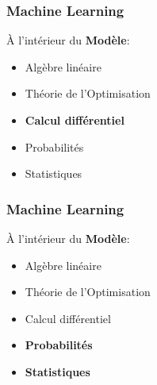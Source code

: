 \documentclass{formation}
\begin{document}
\begin{frame}
  \frametitle{Machine Learning}
  \begin{minipage}[c]{0.41\linewidth}
    À l'intérieur du \textbf{Modèle}:
    \begin{itemize}
    \item Algèbre linéaire
    \item Théorie de l'Optimisation
    \item \textbf{Calcul différentiel}
    \item Probabilités
    \item Statistiques
    \end{itemize}
  \end{minipage}\hfill
  \begin{minipage}[c]{0.58\linewidth}
  \end{minipage}\hfill
\end{frame}

\begin{frame}
  \frametitle{Machine Learning}
  \begin{minipage}[c]{0.41\linewidth}
    À l'intérieur du \textbf{Modèle}:
    \begin{itemize}
    \item Algèbre linéaire
    \item Théorie de l'Optimisation
    \item Calcul différentiel
    \item \textbf{Probabilités}
    \item \textbf{Statistiques}
    \end{itemize}
  \end{minipage}\hfill
  \begin{minipage}[c]{0.58\linewidth}
  \end{minipage}\hfill
\end{frame}
\end{document}
